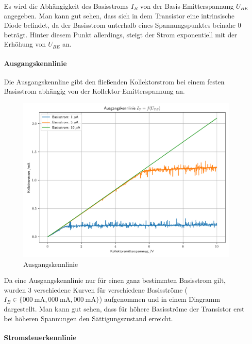 \documentclass[12pt,twoside,a4paper]{scrartcl}
\begin{document}
            Es wird die Abhängigkeit des Basisstroms $I_B$ von der Basis-Emitterspannung $U_{BE}$ angegeben. Man kann gut sehen, dass sich in dem Transistor eine intrinsische Diode befindet, da der Basisstrom unterhalb eines Spannungspunktes beinahe $0$ beträgt. Hinter diesem Punkt allerdings, steigt der Strom exponentiell mit der Erhöhung von $U_{BE}$ an.


        \paragraph{Ausgangskennlinie}

					Die Ausgangskennline gibt den fließenden Kollektorstrom bei einem festen Basisstrom abhängig von der Kollektor-Emitterspannung an.

            \begin{figure}[H]
                \centering

                \includegraphics[width = 0.9 \textwidth]{Plots/Transistor/Ausgangskennlinen}

                \caption{Ausgangskennlinie}
            \end{figure}

            Da eine Ausgangskennlinie nur für einen ganz bestimmten Basisstrom gilt, wurden 3 verschiedene Kurven für verschiedene Basisströme ($I_B \in \{ \SI{000}{\milli \ampere}, \SI{000}{\milli \ampere}, \SI{000}{\milli \ampere} \}$) aufgenommen und in einem Diagramm dargestellt. Man kann gut sehen, dass für höhere Basisströme der Transistor erst bei höheren Spannungen den Sättigungszustand erreicht.


    \paragraph{Stromsteuerkennlinie}
\end{document}
